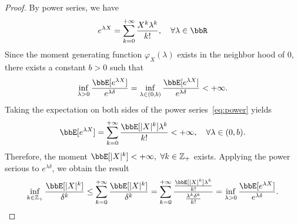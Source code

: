 \documentclass[11pt]{article}
\theoremstyle{plain}
\theoremstyle{definition}
\begin{document}
\begin{proof}
	By power series, we have
	\begin{equation}\label{eq:power}
		 e^{\lambda X} = \sum_{k = 0}^{+\infty } \frac{X^k \lambda^k }{k!}, \quad \forall \lambda \in \bbR
	\end{equation}
	Since the moment generating function $\varphi_X(\lambda)$ exists in the neighbor hood of 0, there exists a constant $b > 0$ such that 
	\[  \inf_{\lambda >0} \frac{\bbE[e^{\lambda X}]}{e^{\lambda \delta}} = \inf_{\lambda \in (0,b)} \frac{\bbE[e^{\lambda X}]}{e^{\lambda \delta}} < +\infty. \]
	Taking the expectation on both sides of the power series~\eqref{eq:power} yields
	\[   \bbE [e^{\lambda X} ]= \sum_{k = 0}^{+\infty } \frac{ \bbE[|X|^k]  \lambda^k }{k!} < +\infty,\quad \forall \lambda \in (0,b). \]
	Therefore, the moment $\bbE[|X|^k] < +\infty,\  \forall k \in \mathbb{Z}_+$ exists. Applying the power serious to $e^{\lambda \delta}$, we obtain the result
	\[ \inf_{k \in \mathbb{Z_+} } \frac{\bbE[|X|^k]}{\delta^k} \leq \sum_{k = 0}^{+\infty } \frac{ \bbE[|X|^k] }{\delta^k} = \sum_{k = 0}^{+\infty } \frac{\frac{ \bbE[|X|^k]  \lambda^k }{k!} }{\frac{\lambda^k \delta^k }{k!}  } = \inf_{\lambda > 0} \frac{\bbE[e^{\lambda X}]}{e^{\lambda \delta}}.  \]
\end{proof}
\end{document}
